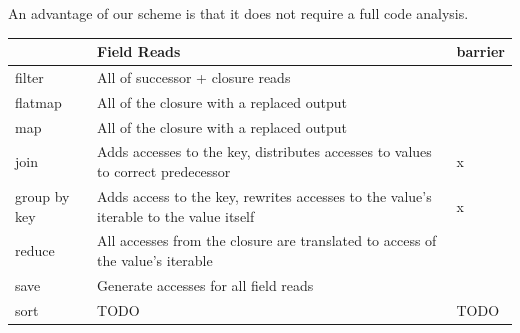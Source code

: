 An advantage of our scheme is that it does not require a full code analysis.

\todo{}

\begin{table}
    \begin{tabular}{l|l|l}
    
        ~            & Field Reads                                                                           & barrier \\ \hline
        filter       & All of successor + closure reads                                                      & ~       \\ 
        flatmap      & All of the closure with a replaced output                                             & ~       \\ 
        map          & All of the closure with a replaced output                                             & ~       \\ 
        join         & Adds accesses to the key, distributes accesses to values to correct predecessor       & x       \\ 
        group by key & Adds access to the key, rewrites accesses to the value's iterable to the value itself & x       \\ 
        reduce       & All accesses from the closure are translated to access of the value's iterable        & ~       \\ 
        save         & Generate accesses for all field reads                                                 & ~       \\ 
        sort         & TODO                                                                                  & TODO    \\ 


    \end{tabular}
    \label{table:field_reduction}
\end{table}

